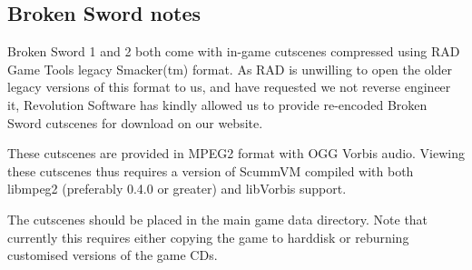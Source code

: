 \subsection {Broken Sword notes}
Broken Sword 1 and 2 both come with in-game cutscenes compressed using 
RAD Game Tools legacy Smacker(tm) format. As RAD is unwilling to open
the older legacy versions of this format to us, and have requested we not
reverse engineer it, Revolution Software has kindly allowed us to provide
re-encoded Broken Sword cutscenes for download on our website.

These cutscenes are provided in MPEG2 format with OGG Vorbis audio.
Viewing these cutscenes thus requires a version of ScummVM compiled 
with both libmpeg2 (preferably 0.4.0 or greater) and libVorbis support.

The cutscenes should be placed in the main game data directory. Note that
currently this requires either copying the game to harddisk or reburning
customised versions of the game CDs.
